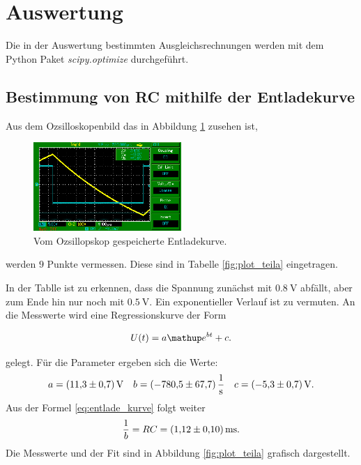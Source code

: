 \section{Auswertung}
Die in der Auswertung bestimmten Ausgleichsrechnungen werden mit
dem Python Paket \emph{scipy.optimize} durchgeführt. %

\subsection{Bestimmung von RC mithilfe der Entladekurve}

Aus dem Ozsilloskopenbild das in Abbildung \ref{fig:entladekurve} zusehen ist, %

\begin{figure}
  \centering
  \includegraphics[width=0.5\textwidth]{pics/bilda_508hz.png}
  \caption{Vom Ozsillopskop gespeicherte Entladekurve.}
  \label{fig:entladekurve}
\end{figure}
werden  $9$ Punkte vermessen.
Diese sind in Tabelle \ref{fig:plot_teila} eingetragen.


In der Tablle ist zu erkennen, dass die Spannung zunächst mit $\SI{0.8}{\volt}$ %
abfällt, aber zum Ende hin nur noch mit $\SI{0.5}{\volt}$. %
Ein exponentieller Verlauf ist zu vermuten. %
An die Messwerte wird eine Regressionskurve der Form %

\begin{equation*}
  U(t)=a\map{e}^{bt}+c.
\end{equation*}

gelegt.
Für die Parameter ergeben sich die Werte:
\begin{equation}
  \label{eq:parameter_teila}
a=\SI{11.3\pm0.7}{\volt} \quad b=\SI{-780.5\pm67.7}{\per\second} \quad c=\SI{-5.3\pm0.7}{\volt}. %
\end{equation}
Aus der Formel  \eqref{eq:entlade_kurve} folgt weiter
\begin{equation}
  \frac{1}{b}=RC=\SI{1.12\pm0.1}{\milli\second}.
\end{equation}
Die Messwerte und der Fit sind in Abbildung \ref{fig:plot_teila} grafisch
dargestellt.



